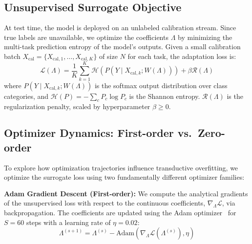 \subsection{Unsupervised Surrogate Objective}

At test time, the model is deployed on an unlabeled calibration stream. 
Since true labels are unavailable, we optimize the coefficients $\Lambda$ by minimizing the multi-task prediction entropy of the model's outputs. 
Given a small calibration batch $X_{\text{cal}} = \{X_{\text{cal}, 1}, \dots, X_{\text{cal}, K}\}$ of size $N$ for each task, the adaptation loss is:
\begin{equation}
\mathcal{L}(\Lambda) = \frac{1}{K} \sum_{k=1}^K \mathcal{H}\left(P(Y \mid X_{\text{cal}, k}; W(\Lambda))\right) + \beta \mathcal{R}(\Lambda)
\end{equation}
where $P(Y \mid X_{\text{cal}, k}; W(\Lambda))$ is the softmax output distribution over class categories, and $\mathcal{H}(P) = -\sum_{c} P_c \log P_c$ is the Shannon entropy. 
$\mathcal{R}(\Lambda)$ is the regularization penalty, scaled by hyperparameter $\beta \geq 0$.

\subsection{Optimizer Dynamics: First-order vs.\ Zero-order}

To explore how optimization trajectories influence transductive overfitting, we optimize the surrogate loss using two fundamentally different optimizer families:

\textbf{Adam Gradient Descent (First-order):} 
We compute the analytical gradients of the unsupervised loss with respect to the continuous coefficients, $\nabla_{\Lambda} \mathcal{L}$, via backpropagation. 
The coefficients are updated using the Adam optimizer~\cite{kingma2014adam} for $S=60$ steps with a learning rate of $\eta = 0.02$:
\begin{equation}
\Lambda^{(s+1)} = \Lambda^{(s)} - \text{Adam}(\nabla_{\Lambda} \mathcal{L}(\Lambda^{(s)}), \eta)
\end{equation}

